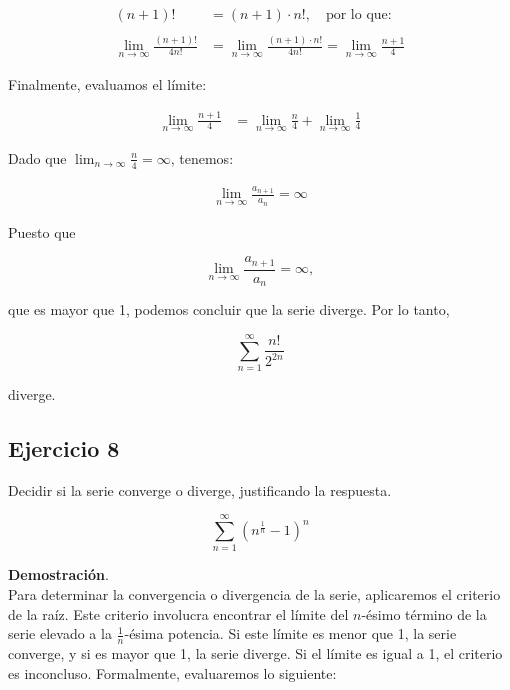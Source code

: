 \documentclass{article}
\begin{document}
    \begin{align*}
    (n+1)! &= (n+1) \cdot n!, \quad \text{por lo que:} \\\\
    \lim _{n \rightarrow \infty} \frac{(n+1)!}{4 n!} &= \lim _{n \rightarrow \infty} \frac{(n+1) \cdot n!}{4 n!} = \lim _{n \rightarrow \infty} \frac{n+1}{4}
    \end{align*}

    Finalmente, evaluamos el límite:

    \begin{align*}
    \lim _{n \rightarrow \infty} \frac{n+1}{4} &= \lim _{n \rightarrow \infty} \frac{n}{4} + \lim _{n \rightarrow \infty} \frac{1}{4}
    \end{align*}

    Dado que \( \lim_{n \rightarrow \infty} \frac{n}{4} = \infty \), tenemos:

    \begin{align*}
    \lim _{n \rightarrow \infty} \frac{a_{n+1}}{a_{n}} = \infty
    \end{align*}

    Puesto que

    $$
    \lim _{n \rightarrow \infty} \frac{a_{n+1}}{a_{n}} = \infty,
    $$

    que es mayor que 1, podemos concluir que la serie diverge. Por lo tanto,

    $$
    \sum_{n=1}^{\infty} \frac{n!}{2^{2 n}}
    $$

    diverge.

    \subsection*{Ejercicio 8}

    Decidir si la serie converge o diverge, justificando la respuesta.

    $$
    \sum_{n=1}^{\infty}\left(n^{\frac{1}{n}}-1\right)^{n}
    $$

    \textbf{Demostración}.\\

    Para determinar la convergencia o divergencia de la serie, aplicaremos el criterio de la raíz. Este criterio involucra encontrar el límite del \( n \)-ésimo término de la serie elevado a la \( \frac{1}{n} \)-ésima potencia. Si este límite es menor que 1, la serie converge, y si es mayor que 1, la serie diverge. Si el límite es igual a 1, el criterio es inconcluso. Formalmente, evaluaremos lo siguiente:
\end{document}
